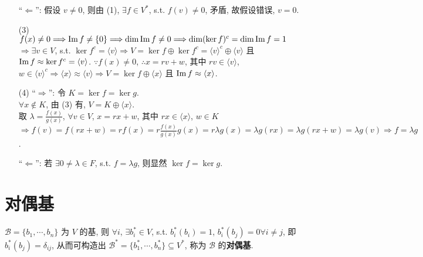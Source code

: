 \documentclass{note}
\begin{document}
\begin{pf}
\begin{itemize}
        ``$\Longleftarrow$'': 假设 $v\neq 0$, 则由 (1), $\exists f\in V^*$, s.t. $f(v)\neq 0$, 矛盾, 故假设错误, $v=0$.
        \item[(3)] $f(x)\neq 0\Longrightarrow\operatorname{Im} f\neq\{0\}\Longrightarrow\dim\operatorname{Im} f\neq 0\Longrightarrow\dim(\ker f)^c=\dim\operatorname{Im} f=1$\\
        $\Longrightarrow\exists v\in V$, s.t. $\ker f^c=\langle v\rangle\Longrightarrow V=\ker f\oplus\ker f^c=\langle v\rangle^c\oplus\langle v\rangle$ 且 $\operatorname{Im} f\approx\ker f^c=\langle v\rangle$.
        $\because f(x)\neq 0$, $\therefore x=rv+w$, 其中 $rv\in\langle v\rangle$, $w\in\langle v\rangle^c\Longrightarrow\langle x\rangle\approx\langle v\rangle\Longrightarrow V=\ker f\oplus\langle x\rangle$ 且 $\operatorname{Im} f\approx\langle x\rangle$.
        \item[(4)] ``$\Longrightarrow$'': 令 $K=\ker f=\ker g$.\\
        $\forall x\notin K$, 由 (3) 有, $V=K\oplus\langle x\rangle$.\\
        取 $\lambda=\frac{f(x)}{g(x)}$, $\forall v\in V$, $x=rx+w$, 其中 $rx\in\langle x\rangle$, $w\in K$\\
        $\Longrightarrow f(v)=f(rx+w)=rf(x)=r\frac{f(x)}{g(x)}g(x)=r\lambda g(x)=\lambda g(rx)=\lambda g(rx+w)=\lambda g(v)\Longrightarrow f=\lambda g$.

        ``$\Longleftarrow$'': 若 $\exists 0\neq\lambda\in F$, s.t. $f=\lambda g$, 则显然 $\ker f=\ker g$.
    \end{itemize}
\end{pf}

\section{对偶基}
\begin{df}[对偶基]
    $\mathcal{B}=\{b_1,\cdots,b_n\}$ 为 $V$ 的基, 则 $\forall i$, $\exists b_i^*\in V$, s.t. $b_i^*(b_i)=1$, $b_i^*(b_j)=0\forall i\neq j$, 即 $b_i^*(b_j)=\delta_{ij}$, 从而可构造出 $\mathcal{B}^*=\{b_1^*,\cdots,b_n^*\}\subseteq V^*$, 称为 $\mathcal{B}$ 的\textbf{对偶基}.
\end{df}
\end{document}
